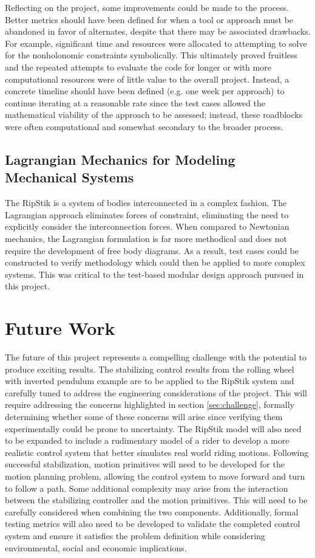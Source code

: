 Reflecting on the project, some improvements could be made to the process. 
Better metrics should have been defined for when a tool or approach must be abandoned in favor of alternates, despite that there may be associated drawbacks. 
For example, significant time and resources were allocated to attempting to solve for the nonholonomic constraints symbolically. 
This ultimately proved fruitless and the repeated attempts to evaluate the code for longer or with more computational resources were of little value to the overall project. 
Instead, a concrete timeline should have been defined (e.g. one week per approach) to continue iterating at a reasonable rate since the test cases allowed the mathematical viability of the approach to be assessed; instead, these roadblocks were often computational and somewhat secondary to the broader process.
\subsection{Lagrangian Mechanics for Modeling Mechanical Systems}
The RipStik is a system of bodies interconnected in a complex fashion. The Lagrangian approach eliminates forces of constraint, eliminating the need to explicitly consider the interconnection forces. When compared to Newtonian mechanics, the Lagrangian formulation is far more methodical and does not require the development of free body diagrams. As a result, test cases could be constructed to verify methodology which could then be applied to more complex systems. This was critical to the test-based modular design approach pursued in this project. 

\section{Future Work}
The future of this project represents a compelling challenge with the potential to produce exciting results. 
The stabilizing control results from the rolling wheel with inverted pendulum example are to be applied to the RipStik system and carefully tuned to address the engineering considerations of the project.
This will require addressing the concerns highlighted in section \ref{sec:challenge}, formally determining whether some of these concerns will arise since verifying them experimentally could be prone to uncertainty.
The RipStik model will also need to be expanded to include a rudimentary model of a rider to develop a more realistic control system that better simulates real world riding motions.
Following successful stabilization, motion primitives will need to be developed for the motion planning problem, allowing the control system to move forward and turn to follow a path.
Some additional complexity may arise from the interaction between the stabilizing controller and the motion primitives. This will need to be carefully considered when combining the two components.
Additionally, formal testing metrics will also need to be developed to validate the completed control system and ensure it satisfies the problem definition while considering environmental, social and economic implications.
